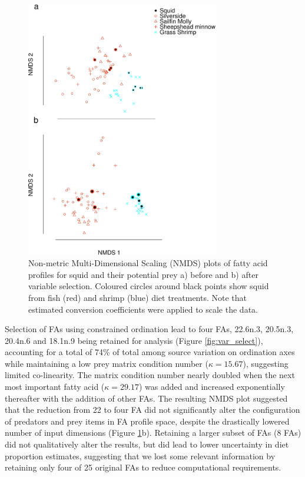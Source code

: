 \documentclass[fleqn,10pt]{wlpeerj}
\begin{document}
\begin{figure}
  \begin{center}
      \includegraphics[width=0.75\textwidth]{figures/2nd_NMDS_pre.pdf}
    \caption{Non-metric Multi-Dimensional Scaling (NMDS) plots of fatty acid profiles
      for 
      squid and their potential prey a) before and b) after variable selection. Coloured circles around black points show squid from fish (red) and shrimp (blue) diet treatments. Note that estimated conversion coefficients were applied to scale the data.}
    \label{fig:squid_FAP}
  \end{center}
\end{figure}

Selection of FAs using constrained ordination
lead to four FAs, 22.6n.3, 20.5n.3, 20.4n.6 and 18.1n.9 being
retained for analysis (Figure \ref{fig:var_select}), accounting for a
total of 74\% of total among source variation on ordination axes
while maintaining a low prey matrix condition number ($\kappa=15.67$),
suggesting limited co-linearity. The matrix condition number nearly
doubled when the next most important fatty acid ($\kappa=29.17$) was added and
increased exponentially thereafter with the addition of other FAs. The
resulting NMDS plot suggested that the reduction from 22 to four FA did
not significantly alter the configuration of predators and prey items
in FA profile space, despite the drastically lowered number of input
dimensions (Figure \ref{fig:squid_FAP}b). Retaining a larger subset of
FAs (8 FAs) did not qualitatively alter the results, but did lead to lower
uncertainty in diet proportion estimates, suggesting that we lost some
relevant information by retaining only four of 25 original FAs to
reduce computational requirements.
\end{document}
